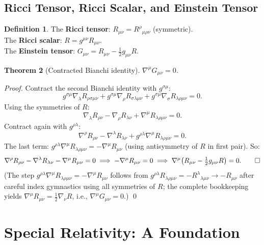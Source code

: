 \documentclass[12pt,a4paper]{article}
\theoremstyle{plain}
\newtheorem{theorem}{Theorem}[section]
\theoremstyle{definition}
\newtheorem{definition}[theorem]{Definition}
\theoremstyle{remark}
\begin{document}
\subsection{Ricci Tensor, Ricci Scalar, and Einstein Tensor}

\begin{definition}
The \textbf{Ricci tensor}: $R_{\mu\nu} = R^\rho{}_{\mu\rho\nu}$ (symmetric).\\
The \textbf{Ricci scalar}: $R = g^{\mu\nu}R_{\mu\nu}$.\\
The \textbf{Einstein tensor}: $G_{\mu\nu} = R_{\mu\nu} - \tfrac{1}{2}g_{\mu\nu}R$.
\end{definition}

\begin{theorem}[Contracted Bianchi identity]\label{thm:cbianchi}
$\nabla^\mu G_{\mu\nu} = 0$.
\end{theorem}
\begin{proof}
Contract the second Bianchi identity with $g^{\sigma\mu}$:
\[
  g^{\sigma\mu}\nabla_\lambda R_{\rho\sigma\mu\nu}
  + g^{\sigma\mu}\nabla_\rho R_{\sigma\lambda\mu\nu}
  + g^{\sigma\mu}\nabla_\sigma R_{\lambda\rho\mu\nu} = 0.
\]
Using the symmetries of $R$:
\[
  \nabla_\lambda R_{\rho\nu} - \nabla_\rho R_{\lambda\nu} + \nabla^\mu R_{\lambda\rho\mu\nu} = 0.
\]
Contract again with $g^{\rho\lambda}$:
\[
  \nabla^\rho R_{\rho\nu} - \nabla^\lambda R_{\lambda\nu} + g^{\rho\lambda}\nabla^\mu R_{\lambda\rho\mu\nu} = 0.
\]
The last term: $g^{\rho\lambda}\nabla^\mu R_{\lambda\rho\mu\nu} = -\nabla^\mu R_{\mu\nu}$ (using antisymmetry of $R$ in first pair). So:
\[
  \nabla^\rho R_{\rho\nu} - \nabla^\lambda R_{\lambda\nu} - \nabla^\mu R_{\mu\nu} = 0
  \implies
  -\nabla^\mu R_{\mu\nu} = 0
  \implies
  \nabla^\mu\!\left(R_{\mu\nu}-\tfrac{1}{2}g_{\mu\nu}R\right)=0. \qed
\]
(The step $g^{\rho\lambda}\nabla^\mu R_{\lambda\rho\mu\nu} = -\nabla^\mu R_{\mu\nu}$ follows from $g^{\rho\lambda}R_{\lambda\rho\mu\nu} = -R^\lambda{}_{\lambda\mu\nu}\to -R_{\mu\nu}$ after careful index gymnastics using all symmetries of $R$; the complete bookkeeping yields $\nabla^\mu R_{\mu\nu} = \tfrac{1}{2}\nabla_\nu R$, i.e., $\nabla^\mu G_{\mu\nu}=0$.) \qed
\end{proof}

\section{Special Relativity: A Foundation}
\end{document}
